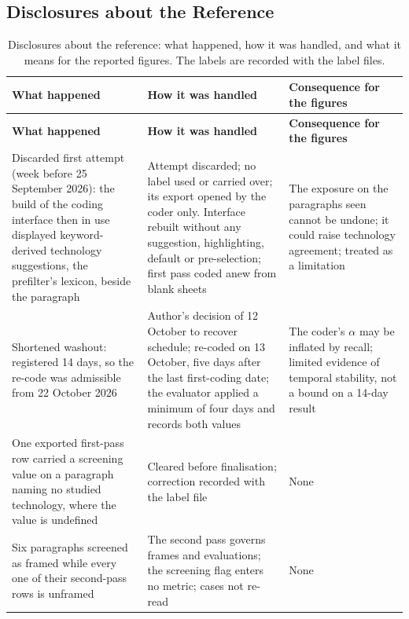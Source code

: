 \subsection{Disclosures about the Reference}\label{app:reference_disclosures}

\begingroup{}\endgroup

\begingroup\scriptsize
\setlength{\tabcolsep}{4pt}
\begin{longtable}{@{}>{\raggedright\arraybackslash}p{36mm}>{\raggedright\arraybackslash}p{64mm}>{\raggedright\arraybackslash}p{52mm}@{}}
\caption[Disclosures about the reference]{Disclosures about the reference: what happened, how it was handled, and what it means for the reported figures. The labels are recorded with the label files.}\label{tab:disclosures} \\
\toprule
\textbf{What happened} & \textbf{How it was handled} & \textbf{Consequence for the figures} \\
\midrule
\endfirsthead
\toprule
\textbf{What happened} & \textbf{How it was handled} & \textbf{Consequence for the figures} \\
\midrule
\endhead
\bottomrule
\endfoot
Discarded first attempt (week before 25 September 2026): the build of the coding interface then in use displayed keyword-derived technology suggestions, the prefilter's lexicon, beside the paragraph & Attempt discarded; no label used or carried over; its export opened by the coder only. Interface rebuilt without any suggestion, highlighting, default or pre-selection; first pass coded anew from blank sheets & The exposure on the paragraphs seen cannot be undone; it could raise technology agreement; treated as a limitation \\
Shortened washout: registered 14 days, so the re-code was admissible from 22 October 2026 & Author's decision of 12 October to recover schedule; re-coded on 13 October, five days after the last first-coding date; the evaluator applied a minimum of four days and records both values & The coder's $\alpha$ may be inflated by recall; limited evidence of temporal stability, not a bound on a 14-day result \\
One exported first-pass row carried a screening value on a paragraph naming no studied technology, where the value is undefined & Cleared before finalisation; correction recorded with the label file & None \\
Six paragraphs screened as framed while every one of their second-pass rows is unframed & The second pass governs frames and evaluations; the screening flag enters no metric; cases not re-read & None \\

\end{longtable}
